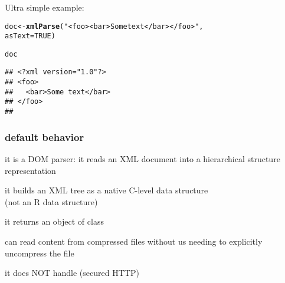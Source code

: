 \documentclass[12pt]{beamer}\usepackage[]{graphicx}\usepackage[]{color}
\makeatletter
\newcommand{\hlnum}[1]{\textcolor[rgb]{0.686,0.059,0.569}{#1}}%
\newcommand{\hlstr}[1]{\textcolor[rgb]{0.192,0.494,0.8}{#1}}%
\newcommand{\hlstd}[1]{\textcolor[rgb]{0.345,0.345,0.345}{#1}}%
\newcommand{\hlkwb}[1]{\textcolor[rgb]{0.69,0.353,0.396}{#1}}%
\newcommand{\hlkwc}[1]{\textcolor[rgb]{0.333,0.667,0.333}{#1}}%
\newcommand{\hlkwd}[1]{\textcolor[rgb]{0.737,0.353,0.396}{\textbf{#1}}}%
\newenvironment{kframe}{%
 \def\at@end@of@kframe{}%
 \ifinner\ifhmode%
  \def\at@end@of@kframe{\end{minipage}}%
  \begin{minipage}{\columnwidth}%
 \fi\fi%
 \def\FrameCommand##1{\hskip\@totalleftmargin \hskip-\fboxsep
 \colorbox{shadecolor}{##1}\hskip-\fboxsep
     \hskip-\linewidth \hskip-\@totalleftmargin \hskip\columnwidth}%
 \MakeFramed {\advance\hsize-\width
   \@totalleftmargin\z@ \linewidth\hsize
   \@setminipage}}%
 {\par\unskip\endMakeFramed%
 \at@end@of@kframe}
\newenvironment{knitrout}{}{} %
\makeatother
\begin{document}

\begin{frame}[fragile]
\frametitle{}

Ultra simple example:
\begin{knitrout}\footnotesize
{}\color{fgcolor}\begin{kframe}
\begin{alltt}
\hlstd{doc} \hlkwb{<-} \hlkwd{xmlParse}\hlstd{(}\hlstr{"<foo><bar>Some text</bar></foo>"}\hlstd{,}
                \hlkwc{asText} \hlstd{=} \hlnum{TRUE}\hlstd{)}

\hlstd{doc}
\end{alltt}
\begin{verbatim}
## <?xml version="1.0"?>
## <foo>
##   <bar>Some text</bar>
## </foo>
## 
\end{verbatim}
\end{kframe}
\end{knitrout}

\end{frame}


\begin{frame}
\frametitle{}
\begin{center}
\end{center}
\end{frame}


\begin{frame}[fragile]
\frametitle{ default behavior}

\bi
 \item it is a DOM parser: it reads an XML document into a hierarchical structure representation
 \item it builds an XML tree as a native C-level data structure \\
 (not an R data structure)
 \item it returns an object of class {\hilit {}}
 \item can read content from compressed files without us needing to explicitly uncompress the file
 \item it does NOT handle  (secured HTTP)
\ei
\eb

\end{frame}
\end{document}
